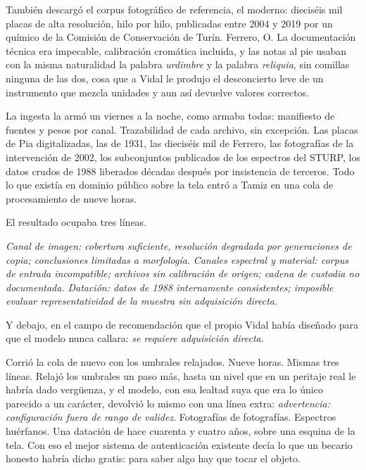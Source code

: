 También descargó el corpus fotográfico de referencia, el moderno: dieciséis mil placas de alta resolución, hilo por hilo, publicadas entre 2004 y 2019 por un químico de la Comisión de Conservación de Turín. Ferrero, O. La documentación técnica era impecable, calibración cromática incluida, y las notas al pie usaban con la misma naturalidad la palabra \textit{urdimbre} y la palabra \textit{reliquia}, sin comillas ninguna de las dos, cosa que a Vidal le produjo el desconcierto leve de un instrumento que mezcla unidades y aun así devuelve valores correctos.


\scenebreak


La ingesta la armó un viernes a la noche, como armaba todas: manifiesto de fuentes y pesos por canal. Trazabilidad de cada archivo, sin excepción. Las placas de Pia digitalizadas, las de 1931, las dieciséis mil de Ferrero, las fotografías de la intervención de 2002, los subconjuntos publicados de los espectros del STURP, los datos crudos de 1988 liberados décadas después por insistencia de terceros. Todo lo que existía en dominio público sobre la tela entró a Tamiz en una cola de procesamiento de nueve horas.

El resultado ocupaba tres líneas.

\textit{Canal de imagen: cobertura suficiente, resolución degradada por generaciones de copia; conclusiones limitadas a morfología.} \textit{Canales espectral y material: corpus de entrada incompatible; archivos sin calibración de origen; cadena de custodia no documentada.} \textit{Datación: datos de 1988 internamente consistentes; imposible evaluar representatividad de la muestra sin adquisición directa.}

Y debajo, en el campo de recomendación que el propio Vidal había diseñado para que el modelo nunca callara: \textit{se requiere adquisición directa}.

Corrió la cola de nuevo con los umbrales relajados. Nueve horas. Mismas tres líneas. Relajó los umbrales un paso más, hasta un nivel que en un peritaje real le habría dado vergüenza, y el modelo, con esa lealtad suya que era lo único parecido a un carácter, devolvió lo mismo con una línea extra: \textit{advertencia: configuración fuera de rango de validez}. Fotografías de fotografías. Espectros huérfanos. Una datación de hace cuarenta y cuatro años, sobre una esquina de la tela. Con eso el mejor sistema de autenticación existente decía lo que un becario honesto habría dicho gratis: para saber algo hay que tocar el objeto.

